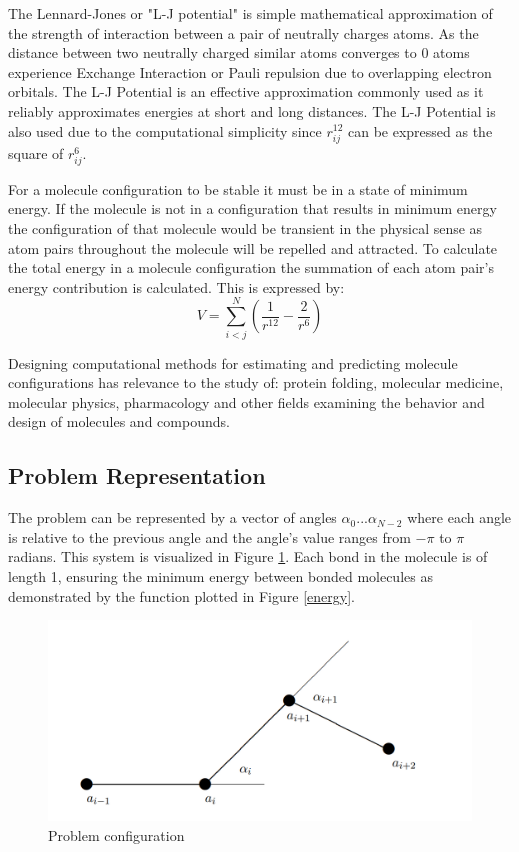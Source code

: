 \documentclass[conference,letterpaper]{IEEEtran}
\begin{document}
\par The Lennard-Jones or "L-J potential" is simple mathematical approximation of the strength of interaction between a pair of neutrally charges atoms. As the distance between two neutrally charged similar atoms converges to 0 atoms experience Exchange Interaction or Pauli repulsion due to overlapping electron orbitals. The L-J Potential is an effective approximation commonly used as it reliably approximates energies at short and long distances. The L-J Potential is also used due to the computational simplicity since $r_{ij}^{12}$ can be expressed as the square of $r_{ij}^6$.

\par For a molecule configuration to be stable it must be in a state of minimum energy. If the molecule is not in a configuration that results in minimum energy the configuration of that molecule would be transient in the physical sense as atom pairs throughout the molecule will be repelled and attracted. To calculate the total energy in a molecule configuration the summation of each atom pair's energy contribution is calculated. This is expressed by:
\begin{equation}
    V = \sum_{i < j}^{N}(\frac{1}{r^{12}} - \frac{2}{r^{6}})
\end{equation}

Designing computational methods for estimating and predicting molecule configurations has relevance to the study of: protein folding, molecular medicine, molecular physics, pharmacology and other fields examining the behavior and design of molecules and compounds.

\subsection{Problem Representation}
\par
The problem can be represented by a vector of angles $\alpha_{0} ... \alpha_{N-2}$ where each angle is relative to the previous angle and the angle's value ranges from $-\pi$ to $\pi$ radians. This system is visualized in Figure \ref{atom configuration}. Each bond in the molecule is of length 1, ensuring the minimum energy between bonded molecules as demonstrated by the function plotted in Figure \ref{energy}.

\begin{figure}[h]
    \includegraphics[scale=0.3]{configuration}
    \caption{Problem configuration}
    \label{atom configuration}
\end{figure}
\end{document}
